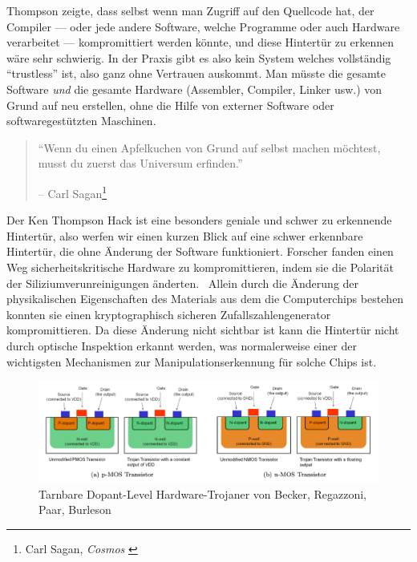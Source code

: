 Thompson zeigte, dass selbst wenn man Zugriff auf den Quellcode hat, der
Compiler --- oder jede andere Software, welche Programme oder auch Hardware
verarbeitet --- kompromittiert werden könnte, und diese Hintertür zu erkennen
wäre sehr schwierig. In der Praxis gibt es also kein System welches vollständig
\enquote{trustless} ist, also ganz ohne Vertrauen auskommt. Man müsste die
gesamte Software \textit{und} die gesamte Hardware (Assembler, Compiler, Linker
usw.) von Grund auf neu erstellen, ohne die Hilfe von externer Software oder
softwaregestützten Maschinen.

\begin{quotation}\begin{samepage}
\enquote{Wenn du einen Apfelkuchen von Grund auf selbst machen möchtest, musst
du zuerst das Universum erfinden.}
\begin{flushright} -- Carl Sagan\footnote{Carl Sagan, \textit{Cosmos} \cite{cosmos}}
\end{flushright}\end{samepage}\end{quotation}

Der Ken Thompson Hack ist eine besonders geniale und schwer zu erkennende
Hintertür, also werfen wir einen kurzen Blick auf eine schwer erkennbare
Hintertür, die ohne Änderung der Software funktioniert. Forscher fanden einen
Weg sicherheitskritische Hardware zu kompromittieren, indem sie die Polarität
der Siliziumverunreinigungen änderten.~\cite{becker2013stealthy}  Allein durch
die Änderung der physikalischen Eigenschaften des Materials aus dem die
Computerchips bestehen konnten sie einen kryptographisch sicheren
Zufallszahlengenerator kompromittieren. Da diese Änderung nicht sichtbar ist
kann die Hintertür nicht durch optische Inspektion erkannt werden, was
normalerweise einer der wichtigsten Mechanismen zur Manipulationserkennung für
solche Chips ist.

\begin{figure}
  \includegraphics{assets/images/stealthy-hardware-trojan.png}
  \caption{Tarnbare Dopant-Level Hardware-Trojaner von Becker, Regazzoni, Paar, Burleson}
  \label{fig:stealthy-hardware-trojan}
\end{figure}

